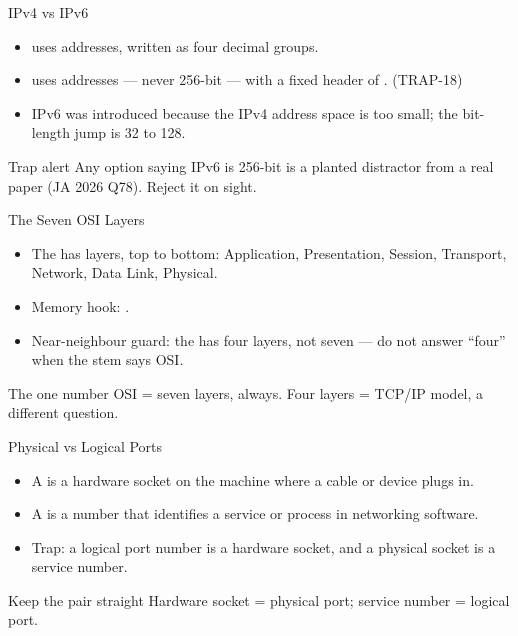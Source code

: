 \documentclass[aspectratio=169]{beamer}
\begin{document}
\begin{frame}{IPv4 vs IPv6}
  \begin{itemize}
    \item {} uses  addresses, written as four decimal
      groups.
    \item {} uses  addresses --- never 256-bit --- with
      a fixed header of . (TRAP-18)
    \item IPv6 was introduced because the IPv4 address space is too small;
      the bit-length jump is 32 to 128.
  \end{itemize}
  \begin{alertblock}{Trap alert}
    Any option saying IPv6 is 256-bit is a planted distractor from a real
    paper (JA 2026 Q78). Reject it on sight.
  \end{alertblock}
\end{frame}

\begin{frame}{The Seven OSI Layers}
  \begin{itemize}
    \item The  has  layers, top to bottom:
      Application, Presentation, Session, Transport, Network, Data Link,
      Physical.
    \item Memory hook: .
    \item Near-neighbour guard: the  has four layers, not
      seven --- do not answer ``four'' when the stem says OSI.
  \end{itemize}
  \begin{block}{The one number}
    OSI = seven layers, always. Four layers = TCP/IP model, a different
    question.
  \end{block}
\end{frame}

\begin{frame}{Physical vs Logical Ports}
  \begin{itemize}
    \item A  is a hardware socket on the machine where a
      cable or device plugs in.
    \item A  is a number that identifies a service or
      process in networking software.
    \item Trap: a logical port number is  a hardware socket, and a
      physical socket is  a service number.
  \end{itemize}
  \begin{block}{Keep the pair straight}
    Hardware socket = physical port; service number = logical port.
  \end{block}
\end{frame}
\end{document}
